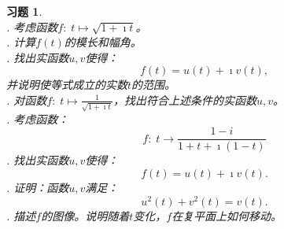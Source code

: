 \documentclass[12pt,UTF8]{ctexbook}
\theoremstyle{definition}
\theoremstyle{plain}
\newtheorem{sk}{思考}[section]
\newtheorem{xt}{习题}[section]
\begin{document}
\begin{xt}
    \mbox{} \\
    . 考虑函数$f:\; t\mapsto \sqrt{1 + \imath t}$。\\
    . 计算$f(t)$的模长和幅角。\\
    . 找出实函数$u,v$使得：
    $$ f(t) = u(t) + \imath v(t), $$
    \indent 并说明使等式成立的实数$t$的范围。\\
    . 对函数$f:\;t\mapsto \frac{1}{\sqrt{1 + \imath t}}$，找出符合上述条件的实函数$u,v$。\\
    . 考虑函数：
    $$ f:\; t \to \frac{1 - i}{1 + t + \imath(1 - t)}$$
    . 找出实函数$u,v$使得：
    $$ f(t) = u(t) + \imath v(t). $$
    . 证明：函数$u,v$满足：
    $$ u^2(t) + v^2(t) = v(t).$$
    . 描述$f$的图像。说明随着$t$变化，$f$在复平面上如何移动。

\end{xt}




\end{document}
